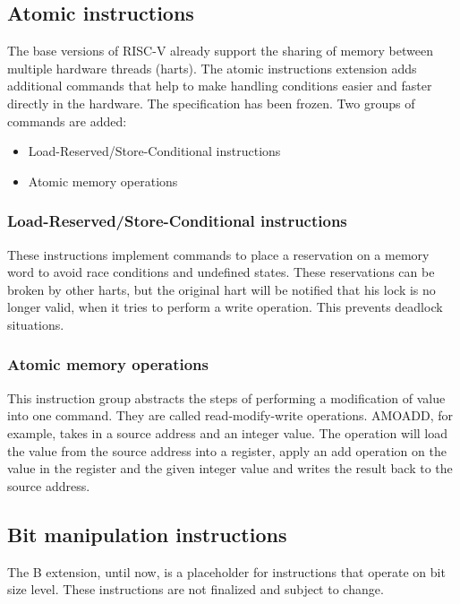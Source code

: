 \subsection{Atomic instructions}
The base versions of RISC-V already support the sharing of
memory between multiple hardware threads (harts).
The atomic instructions extension adds additional commands
that help to make handling conditions easier and faster
directly in the hardware. The specification has been frozen.
Two groups of commands are added:
\begin{itemize}
    \item Load-Reserved/Store-Conditional instructions
    \item Atomic memory operations
\end{itemize}

\subsubsection{Load-Reserved/Store-Conditional instructions}
These instructions implement commands to place a reservation on a memory word
to avoid race conditions and undefined states.
These reservations can be broken by other harts, but the original
hart will be notified that his lock is no longer valid, when it
tries to perform a write operation.
This prevents deadlock situations.

\subsubsection{Atomic memory operations}
This instruction group abstracts the steps of performing a
modification of value into one command. They are called
read-modify-write operations. AMOADD, for example, takes in a
source address and an integer value.
The operation will load the value from the source address into
a register, apply an add operation on the value in the register
and the given integer value and writes the result back to the
source address.

\subsection{Bit manipulation instructions}
The B extension, until now, is a placeholder for instructions
that operate on bit size level. These instructions are not finalized
and subject to change.

